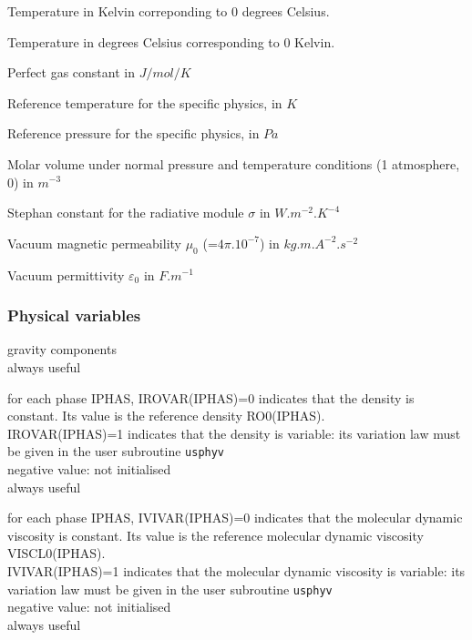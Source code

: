 {Temperature in Kelvin correponding to 0 degrees Celsius.}

{Temperature in degrees Celsius corresponding to 0 Kelvin.}

{Perfect gas constant in $J/mol/K$}

{Reference temperature for the specific physics, in $K$}

{Reference pressure for the specific physics, in $Pa$}

{Molar volume under normal pressure and temperature conditions (1 atmosphere,
0\degresC) in $m^{-3}$}

{Stephan constant for the radiative module $\sigma$ in $W.m^{-2}.K^{-4}$}

{Vacuum magnetic permeability $\mu_0$ (=$4\pi.10^{-7}$) in $kg.m.A^{-2}.s^{-2}$}

{Vacuum permittivity $\varepsilon_0$ in $F.m^{-1}$}



\subsubsection{Physical variables}

{gravity components\\
always useful }

{for each phase IPHAS, IROVAR(IPHAS)=0 indicates that the density is
constant. Its value is the reference density RO0(IPHAS).\\
IROVAR(IPHAS)=1 indicates that the density is variable: its variation
law must be given in the user subroutine \texttt{usphyv}\\
negative value: not initialised\\
always useful} 

{for each phase IPHAS, IVIVAR(IPHAS)=0 indicates that the molecular
dynamic viscosity is constant. Its value is the reference molecular
dynamic viscosity VISCL0(IPHAS).\\ 
IVIVAR(IPHAS)=1 indicates that the molecular dynamic viscosity is
variable: its variation law must be given in the user subroutine
\texttt{usphyv}\\ 
negative value: not initialised\\
always useful} 

